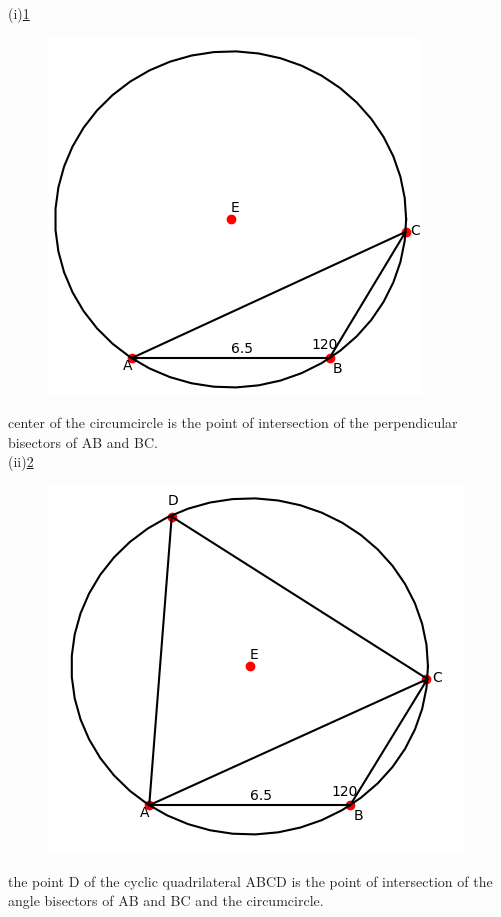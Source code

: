 \documentclass[journal,12pt,twocolumn]{IEEEtran}
\renewcommand\thesection{\arabic{section}}
\begin{document}
\begin{enumerate}[label=\thesection.\arabic*.,ref=\thesection.\theenumi]
(i)\ref{fig1} \\
\begin{figure}[h!]
\centering
\includegraphics[width = \columnwidth]{fig1.png}
\caption{}
\label{fig1}
\end{figure}
center of the circumcircle is the point of intersection of the perpendicular bisectors of AB and BC.\\

(ii)\ref{fig2} \\
\begin{figure}[h!]
\centering
\includegraphics[width = \columnwidth]{fig2.png}\\
\caption{}
\label{fig2}
\end{figure}
the point D of the cyclic quadrilateral ABCD is the point of intersection of the angle 
bisectors of AB and BC and the circumcircle.
\\

\end{enumerate}
\end{document}
